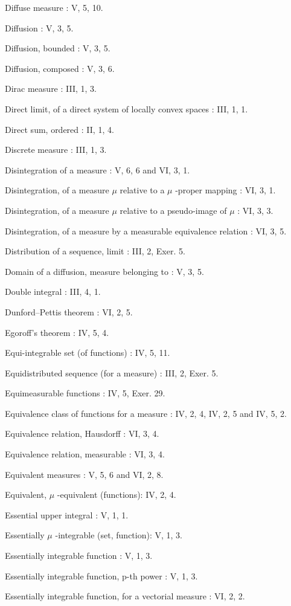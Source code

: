 Diffuse measure : V, 5, 10.

Diffusion : V, 3, 5.

Diffusion, bounded : V, 3, 5.

Diffusion, composed : V, 3, 6.

Dirac measure : III, 1, 3.

Direct limit, of a direct system of locally convex spaces : III, 1, 1.

Direct sum, ordered : II, 1, 4.

Discrete measure : III, 1, 3.

Disintegration of a measure : V, 6, 6 and VI, 3, 1.

Disintegration, of a measure \(\mu\) relative to a \(\mu\) -proper mapping : VI, 3, 1.

Disintegration, of a measure \(\mu\) relative to a pseudo-image of \(\mu\) : VI, 3, 3.

Disintegration, of a measure by a measurable equivalence relation : VI, 3, 5.

Distribution of a sequence, limit : III, 2, Exer. 5.

Domain of a diffusion, measure belonging to : V, 3, 5.

Double integral : III, 4, 1.

Dunford--Pettis theorem : VI, 2, 5.

Egoroff's theorem : IV, 5, 4.

Equi-integrable set (of functions) : IV, 5, 11.

Equidistributed sequence (for a measure) : III, 2, Exer. 5.

Equimeasurable functions : IV, 5, Exer. 29.

Equivalence class of functions for a measure : IV, 2, 4, IV, 2, 5 and IV, 5, 2.

Equivalence relation, Hausdorff : VI, 3, 4.

Equivalence relation, measurable : VI, 3, 4.

Equivalent measures : V, 5, 6 and VI, 2, 8.

Equivalent, \(\mu\) -equivalent (functions): IV, 2, 4.

Essential upper integral : V, 1, 1.

Essentially \(\mu\) -integrable (set, function): V, 1, 3.

Essentially integrable function : V, 1, 3.

Essentially integrable function, p-th power : V, 1, 3.

Essentially integrable function, for a vectorial measure : VI, 2, 2.

